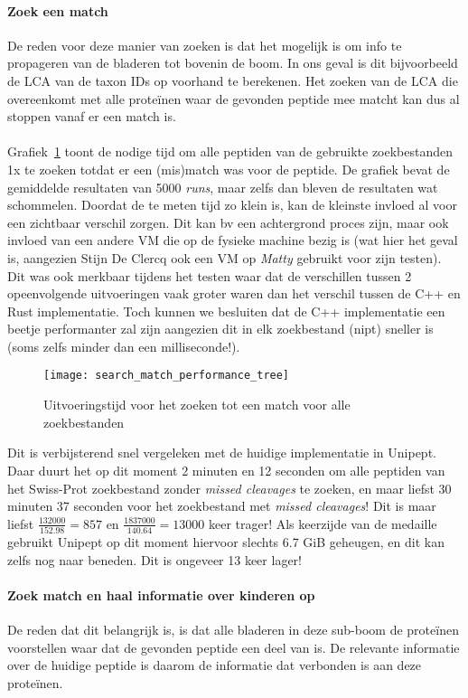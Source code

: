 \paragraph{Zoek een match}
De reden voor deze manier van zoeken is dat het mogelijk is om info te propageren van de bladeren tot bovenin de boom.
In ons geval is dit bijvoorbeeld de LCA van de taxon IDs op voorhand te berekenen.
Het zoeken van de LCA die overeenkomt met alle proteïnen waar de gevonden peptide mee matcht kan dus al stoppen vanaf er een match is.
\\ \\
Grafiek~\ref{fig:performance_match_tree} toont de nodige tijd om alle peptiden van de gebruikte zoekbestanden 1x te zoeken totdat er een (mis)match was voor de peptide.
De grafiek bevat de gemiddelde resultaten van 5000 \textit{runs}, maar zelfs dan bleven de resultaten wat schommelen.
Doordat de te meten tijd zo klein is, kan de kleinste invloed al voor een zichtbaar verschil zorgen.
Dit kan bv een achtergrond proces zijn, maar ook invloed van een andere VM die op de fysieke machine bezig is (wat hier het geval is, aangezien Stijn De Clercq ook een VM op \textit{Matty} gebruikt voor zijn testen).
Dit was ook merkbaar tijdens het testen waar dat de verschillen tussen 2 opeenvolgende uitvoeringen vaak groter waren dan het verschil tussen de C++ en Rust implementatie.
Toch kunnen we besluiten dat de C++ implementatie een beetje performanter zal zijn aangezien dit in elk zoekbestand (nipt) sneller is (soms zelfs minder dan een milliseconde!).

\begin{figure}[H]
    \centering
    \texttt{[image: search\_match\_performance\_tree]}
    \caption{Uitvoeringstijd voor het zoeken tot een match voor alle zoekbestanden}
    \label{fig:performance_match_tree}
\end{figure}

Dit is verbijsterend snel vergeleken met de huidige implementatie in Unipept.
Daar duurt het op dit moment 2 minuten en 12 seconden om alle peptiden van het Swiss-Prot zoekbestand zonder \textit{missed cleavages} te zoeken,
en maar liefst 30 minuten 37 seconden voor het zoekbestand met \textit{missed cleavages}!
Dit is maar liefst $\frac{132 000}{152.98} = 857$ en $\frac{1 837 000}{140.64} = 13 000$ keer trager!
Als keerzijde van de medaille gebruikt Unipept op dit moment hiervoor slechts 6.7 GiB geheugen, en dit kan zelfs nog naar beneden.
Dit is ongeveer 13 keer lager!

\paragraph{Zoek match en haal informatie over kinderen op}
De reden dat dit belangrijk is, is dat alle bladeren in deze sub-boom de proteïnen voorstellen waar dat de gevonden peptide een deel van is.
De relevante informatie over de huidige peptide is daarom de informatie dat verbonden is aan deze proteïnen. %

